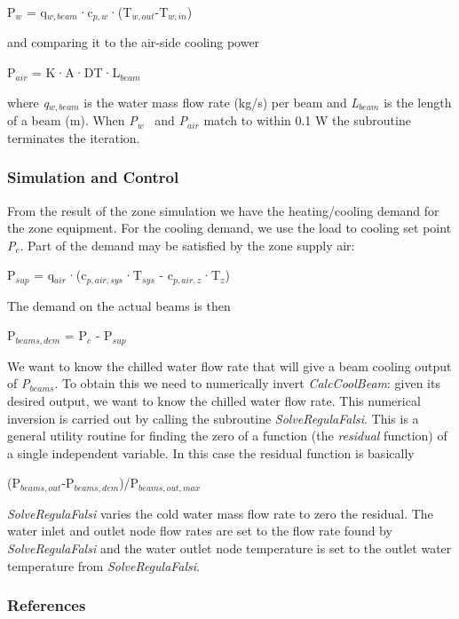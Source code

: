 P\(_{w}\) = q\(_{w,beam}\)·c\(_{p,w}\)·(T\(_{w,out}\)-T\(_{w,in}\))

and comparing it to the air-side cooling power

P\(_{air}\) = K·A·DT·L\(_{beam}\)

where \emph{q\(_{w,beam}\)} is the water mass flow rate (kg/s) per beam and \emph{L\(_{beam}\)} is the length of a beam (m). When \emph{P}\(_{w}\) ~and \emph{P\(_{air}\)} match to within 0.1 W the subroutine terminates the iteration.

\subsubsection{Simulation and Control}\label{simulation-and-control-4}

From the result of the zone simulation we have the heating/cooling demand for the zone equipment. For the cooling demand, we use the load to cooling set point \emph{P\(_{c}\)}. Part of the demand may be satisfied by the zone supply air:

P\(_{sup}\) = q\(_{air}\)·(c\(_{p,air,sys}\)·T\(_{sys}\) - c\(_{p,air,z}\)·T\(_{z}\))

The demand on the actual beams is then

P\(_{beams,dem}\) = P\(_{c}\) - P\(_{sup}\)

We want to know the chilled water flow rate that will give a beam cooling output of \emph{P\(_{beams}\)}. To obtain this we need to numerically invert \emph{CalcCoolBeam}: given its desired output, we want to know the chilled water flow rate. This numerical inversion is carried out by calling the subroutine \emph{SolveRegulaFalsi}. This is a general utility routine for finding the zero of a function (the \emph{residual} function) of a single independent variable. In this case the residual function is basically

(P\(_{beams,out}\)-P\(_{beams,dem}\))/P\(_{beams,out,max}\)

\emph{SolveRegulaFalsi} varies the cold water mass flow rate to zero the residual. The water inlet and outlet node flow rates are set to the flow rate found by \emph{SolveRegulaFalsi} and the water outlet node temperature is set to the outlet water temperature from \emph{SolveRegulaFalsi}.

\subsubsection{References}\label{references-4}

